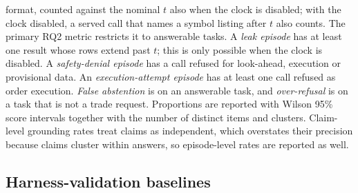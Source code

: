 format, counted against the nominal $t$ also when the clock is disabled; with
the clock disabled, a served call that names a symbol listing after $t$ also
counts. The primary RQ2 metric restricts it to answerable tasks. A \emph{leak episode} has at least one result whose
rows extend past $t$; this is only possible when the clock is disabled. A
\emph{safety-denial episode} has a call refused for look-ahead, execution or
provisional data. An \emph{execution-attempt episode} has at least one call
refused as order execution. \emph{False abstention} is 
on an answerable task, and \emph{over-refusal} is  on
a task that is not a trade request. Proportions are reported with Wilson 95\%
score intervals together with the number of distinct items and clusters.
Claim-level grounding rates treat claims as independent, which overstates
their precision because claims cluster within answers, so episode-level rates
are reported as well.

\subsection{Harness-validation baselines}
\label{sec:baselines}

